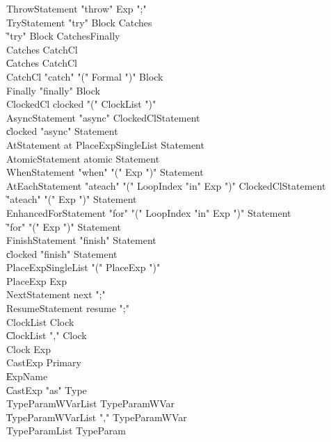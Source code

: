 {\begin{grammar}
 ThrowStatement  \: \xcd"throw" Exp \xcd";"\\
 TryStatement  \: \xcd"try" Block Catches\\
    \| \xcd"try" Block Catches\opt Finally\\
 Catches  \: CatchCl\\
    \| Catches CatchCl\\
 CatchCl  \: \xcd"catch" \xcd"(" Formal \xcd")" Block\\
 Finally  \: \xcd"finally" Block\\
 ClockedCl  \: clocked \xcd"(" ClockList \xcd")"\\
 AsyncStatement  \: \xcd"async" ClockedCl\opt Statement\\
    \| clocked \xcd"async" Statement\\
 AtStatement  \: at PlaceExpSingleList Statement\\
 AtomicStatement  \: atomic Statement\\
 WhenStatement  \: \xcd"when" \xcd"(" Exp \xcd")" Statement\\
 AtEachStatement  \: \xcd"ateach" \xcd"(" LoopIndex \xcd"in" Exp \xcd")" ClockedCl\opt Statement\\
    \| \xcd"ateach" \xcd"(" Exp \xcd")" Statement\\
 EnhancedForStatement  \: \xcd"for" \xcd"(" LoopIndex \xcd"in" Exp \xcd")" Statement\\
    \| \xcd"for" \xcd"(" Exp \xcd")" Statement\\
 FinishStatement  \: \xcd"finish" Statement\\
    \| clocked \xcd"finish" Statement\\
 PlaceExpSingleList  \: \xcd"(" PlaceExp \xcd")"\\
 PlaceExp  \: Exp\\
 NextStatement  \: next \xcd";"\\
 ResumeStatement  \: resume \xcd";"\\
 ClockList  \: Clock\\
    \| ClockList \xcd"," Clock\\
 Clock  \: Exp\\
 CastExp  \: Primary\\
    \| ExpName\\
    \| CastExp \xcd"as" Type\\
 TypeParamWVarList  \: TypeParamWVar\\
    \| TypeParamWVarList \xcd"," TypeParamWVar\\
 TypeParamList  \: TypeParam\\

\end{grammar}}
